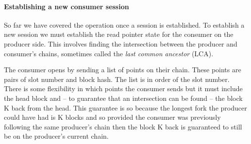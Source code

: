 \documentclass{article}
\theoremstyle{definition}{
  \newtheorem{lemma}{Lemma}[section] %
  \newtheorem{definition}[lemma]{Definition}
}
\theoremstyle{theorem}{
  \newtheorem{invariant}[lemma]{Invariant}
  \newtheorem{proofobligation}[lemma]{Proof Obligation}
}
\numberwithin{equation}{lemma}
\begin{document}
\paragraph{Establishing a new consumer session}

So far we have covered the operation once a session is established. To
establish a new session we must establish the read pointer state for the
consumer on the producer side. This involves finding the intersection between
the producer and consumer's chains, sometimes called the \emph{last common
ancestor} (LCA).

The consumer opens by sending a list of points on their chain. These points
are pairs of slot number and block hash. The list is in order of the slot
number. There is some flexibility in which points the consumer sends but it
must include the head block and -- to guarantee that an intersection can be
found -- the block K back from the head. This guarantee is so because the
longest fork the producer could have had is K blocks and so provided the
consumer was previously following the same producer's chain then the block K
back is guaranteed to still be on the producer's current chain.
\end{document}
